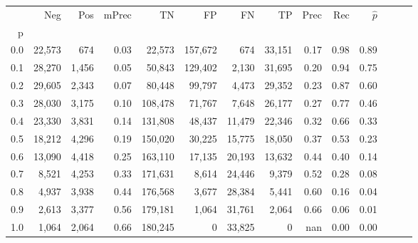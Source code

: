 \begin{tabular}{rrrrrrrrrrrrrr}
\toprule
{} &     Neg &    Pos & mPrec &       TN &       FP &      FN &      TP &  Prec &   Rec & $\hat{p}$ \\
p   &         &        &       &          &          &         &         &       &       &           \\
\midrule
0.0 &  22,573 &    674 &  0.03 &   22,573 &  157,672 &     674 &  33,151 &  0.17 &  0.98 &      0.89 \\
0.1 &  28,270 &  1,456 &  0.05 &   50,843 &  129,402 &   2,130 &  31,695 &  0.20 &  0.94 &      0.75 \\
0.2 &  29,605 &  2,343 &  0.07 &   80,448 &   99,797 &   4,473 &  29,352 &  0.23 &  0.87 &      0.60 \\
0.3 &  28,030 &  3,175 &  0.10 &  108,478 &   71,767 &   7,648 &  26,177 &  0.27 &  0.77 &      0.46 \\
0.4 &  23,330 &  3,831 &  0.14 &  131,808 &   48,437 &  11,479 &  22,346 &  0.32 &  0.66 &      0.33 \\
0.5 &  18,212 &  4,296 &  0.19 &  150,020 &   30,225 &  15,775 &  18,050 &  0.37 &  0.53 &      0.23 \\
0.6 &  13,090 &  4,418 &  0.25 &  163,110 &   17,135 &  20,193 &  13,632 &  0.44 &  0.40 &      0.14 \\
0.7 &   8,521 &  4,253 &  0.33 &  171,631 &    8,614 &  24,446 &   9,379 &  0.52 &  0.28 &      0.08 \\
0.8 &   4,937 &  3,938 &  0.44 &  176,568 &    3,677 &  28,384 &   5,441 &  0.60 &  0.16 &      0.04 \\
0.9 &   2,613 &  3,377 &  0.56 &  179,181 &    1,064 &  31,761 &   2,064 &  0.66 &  0.06 &      0.01 \\
1.0 &   1,064 &  2,064 &  0.66 &  180,245 &        0 &  33,825 &       0 &   nan &  0.00 &      0.00 \\
\bottomrule
\end{tabular}
